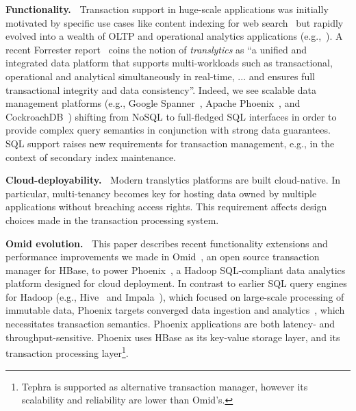 {\bf Functionality.\ }
Transaction support in huge-scale applications was initially motivated by specific use cases like content indexing for web search~\cite{Percolator2010, Omid2017} but  rapidly evolved into a wealth of OLTP and operational analytics 
applications (e.g.,~\cite{Borthakur:2011, F1-2013}). 
A recent Forrester report~\cite{Forrester2017} coins the notion of {\em translytics}  as ``a unified and integrated data platform that supports multi-workloads such as transactional, operational and analytical simultaneously in real-time, ... and ensures full transactional integrity and data consistency''. Indeed, we see scalable data management platforms (e.g., Google Spanner~\cite{Spanner2012}, Apache Phoenix~\cite{phoenix}, and CockroachDB~\cite{cockroach}) shifting from NoSQL to full-fledged SQL interfaces in order to provide complex query semantics in conjunction with strong data guarantees. SQL support raises new requirements for transaction management, e.g., in the context of secondary index maintenance. 

{\bf Cloud-deployability.\ }
Modern translytics platforms are built cloud-native. In particular, multi-tenancy becomes key 
for hosting data owned by multiple applications without breaching access rights. This requirement 
affects design choices made in the transaction processing system. 

{\bf Omid evolution.\ }
This paper describes recent functionality extensions and performance improvements 
we made in Omid~\cite{omid}, an open source transaction manager for HBase, to power 
Phoenix~\cite{phoenix},  a Hadoop SQL-compliant  data analytics platform designed 
for cloud deployment. In contrast to earlier SQL query engines for Hadoop (e.g., 
Hive~\cite{hive} and Impala~\cite{impala}), which focused on large-scale processing
of immutable data, Phoenix targets converged data ingestion and analytics~\cite{PhoenixUseCases},
which necessitates transaction semantics. Phoenix
applications are both latency- and throughput-sensitive. Phoenix uses HBase 
as its key-value storage layer, and  its transaction processing layer\footnote{
\small{Tephra is supported as alternative transaction manager, however its scalability 
and reliability are lower than Omid's.}}. 



